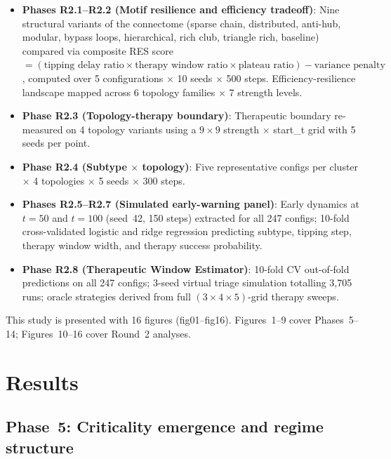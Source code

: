 \documentclass[12pt,a4paper]{article}
\begin{document}
\begin{itemize}
\item \textbf{Phases R2.1--R2.2 (Motif resilience and efficiency tradeoff)}: Nine structural
variants of the connectome (sparse chain, distributed, anti-hub, modular, bypass loops,
hierarchical, rich club, triangle rich, baseline) compared via composite RES score
$= (\text{tipping delay ratio} \times \text{therapy window ratio} \times \text{plateau ratio})
- \text{variance penalty}$, computed over 5 configurations $\times$ 10 seeds $\times$ 500 steps.
Efficiency-resilience landscape mapped across 6 topology families $\times$ 7 strength levels.

\item \textbf{Phase R2.3 (Topology-therapy boundary)}: Therapeutic boundary re-measured on 4
topology variants using a $9 \times 9$ strength $\times$ start\_t grid with 5 seeds per point.

\item \textbf{Phase R2.4 (Subtype $\times$ topology)}: Five representative configs per cluster
$\times$ 4 topologies $\times$ 5 seeds $\times$ 300 steps.

\item \textbf{Phases R2.5--R2.7 (Simulated early-warning panel)}: Early dynamics at $t=50$ and $t=100$
(seed~42, 150 steps) extracted for all 247 configs; 10-fold cross-validated logistic and ridge
regression predicting subtype, tipping step, therapy window width, and therapy success
probability.

\item \textbf{Phase R2.8 (Therapeutic Window Estimator)}: 10-fold CV out-of-fold predictions
on all 247 configs; 3-seed virtual triage simulation totalling 3,705 runs; oracle strategies
derived from full $(3 \times 4 \times 5)$-grid therapy sweeps.
\end{itemize}

This study is presented with 16 figures (fig01--fig16). Figures~1--9 cover Phases~5--14;
Figures~10--16 cover Round~2 analyses.

\clearpage
\section{Results}

\subsection{Phase~5: Criticality emergence and regime structure}
\end{document}
